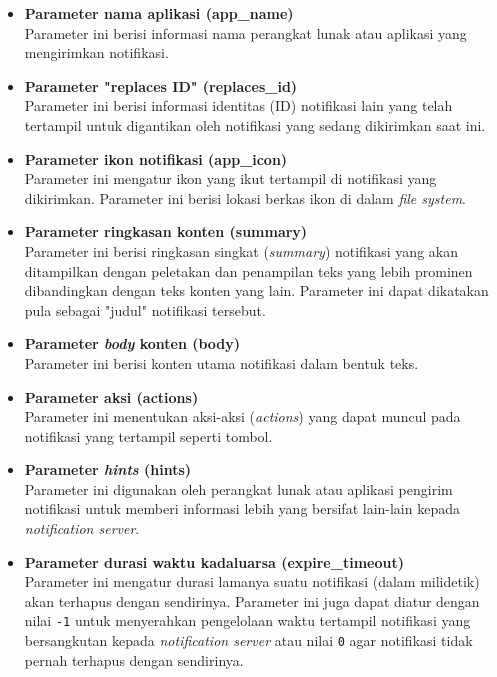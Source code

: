 \begin{itemize}
    \item \textbf{Parameter nama aplikasi (app\_name)}\\
    Parameter ini berisi informasi nama perangkat lunak atau aplikasi yang mengirimkan notifikasi.
    
    \item \textbf{Parameter "replaces ID" (replaces\_id)}\\
    Parameter ini berisi informasi identitas (ID) notifikasi lain yang telah tertampil untuk digantikan oleh notifikasi yang sedang dikirimkan saat ini.

    \item \textbf{Parameter ikon notifikasi (app\_icon)}\\
    Parameter ini mengatur ikon yang ikut tertampil di notifikasi yang dikirimkan. Parameter ini berisi lokasi berkas ikon di dalam \textit{file system}.

    \item \textbf{Parameter ringkasan konten (summary)}\\
    Parameter ini berisi ringkasan singkat (\textit{summary}) notifikasi yang akan ditampilkan dengan peletakan dan penampilan teks yang lebih prominen dibandingkan dengan teks konten yang lain. Parameter ini dapat dikatakan pula sebagai "judul" notifikasi tersebut.
    
    \item \textbf{Parameter \textit{body} konten (body)}\\
    Parameter ini berisi konten utama notifikasi dalam bentuk teks.
    
    \item \textbf{Parameter aksi (actions)}\\
    Parameter ini menentukan aksi-aksi (\textit{actions}) yang dapat muncul pada notifikasi yang tertampil seperti tombol.
    
    \item \textbf{Parameter \textit{hints} (hints)}\\
    Parameter ini digunakan oleh perangkat lunak atau aplikasi pengirim notifikasi untuk memberi informasi lebih yang bersifat lain-lain kepada \textit{notification server}.
    
    \item \textbf{Parameter durasi waktu kadaluarsa (expire\_timeout)}\\
    Parameter ini mengatur durasi lamanya suatu notifikasi (dalam milidetik) akan terhapus dengan sendirinya. Parameter ini juga dapat diatur dengan nilai \verb|-1| untuk menyerahkan pengelolaan waktu tertampil notifikasi yang bersangkutan kepada \textit{notification server} atau nilai \verb|0| agar notifikasi tidak pernah terhapus dengan sendirinya.
\end{itemize}

